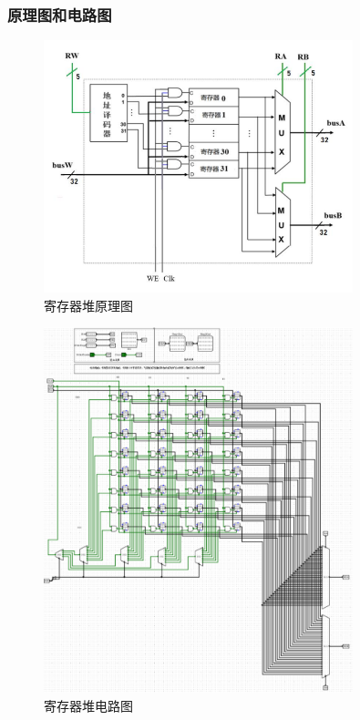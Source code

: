 \documentclass{article}
\begin{document}
    \subsubsection{原理图和电路图}
    \begin{figure}[H]
    \centering
    \includegraphics[width=0.8\textwidth]{5.4.1.png}
    \caption{寄存器堆原理图}
    \end{figure}

    \begin{figure}[H]
    \centering
    \includegraphics[width=0.8\textwidth]{5.4.2.png}
    \caption{寄存器堆电路图}
    \end{figure}
\end{document}
